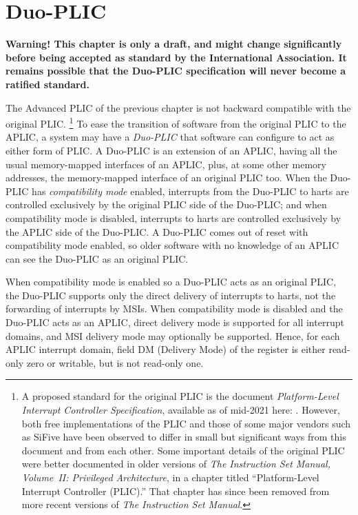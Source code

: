 
\chapter{Duo-PLIC}
\label{ch:DuoPLIC}

\textbf{%
Warning!
This chapter is only a draft, and might change significantly before
being accepted as standard by the {\RISCV} International Association.
It remains possible that the Duo-PLIC specification
will never become a ratified standard.%
}
\bigskip

The Advanced PLIC of the previous chapter is not backward compatible
with the original {\RISCV} PLIC.%
\footnote{%
A proposed standard for the original PLIC is the document
\textit{{\RISCV} Platform-Level Interrupt Controller Specification},
available as of mid-2021 here:
.
However, both free implementations of the PLIC and those of some major
{\RISCV} vendors such as SiFive have been observed to differ in small
but significant ways from this document and from each other.
Some important details of the original PLIC were better documented in
older versions of
\textit{The {\RISCV} Instruction Set Manual, Volume~II: Privileged
Architecture}, in a chapter titled
``Platform-Level Interrupt Controller (PLIC).''
That chapter has since been removed from more recent versions of
\textit{The {\RISCV} Instruction Set Manual}.%
}
To ease the transition of software from the original PLIC to the
APLIC, a {\RISCV} system may have a \emph{\mbox{Duo-PLIC\/}}
that software can configure to act as either form of PLIC.
A \mbox{Duo-PLIC} is an extension of an APLIC, having all the
usual memory-mapped interfaces of an APLIC, plus, at some other
memory addresses, the memory-mapped interface of an original {\RISCV}
PLIC too.
When the \mbox{Duo-PLIC} has \emph{compatibility mode} enabled,
interrupts from the \mbox{Duo-PLIC} to harts are controlled exclusively
by the original PLIC side of the \mbox{Duo-PLIC};
and when compatibility mode is disabled, interrupts to harts
are controlled exclusively by the APLIC side of the
\mbox{Duo-PLIC}.
A \mbox{Duo-PLIC} comes out of reset with compatibility mode enabled,
so older software with no knowledge of an APLIC can see the
\mbox{Duo-PLIC} as an original PLIC.

When compatibility mode is enabled so a \mbox{Duo-PLIC} acts as an
original PLIC, the \mbox{Duo-PLIC} supports only the direct delivery of
interrupts to harts, not the forwarding of interrupts by MSIs.
When compatibility mode is disabled and the \mbox{Duo-PLIC} acts as
an APLIC, direct delivery mode is supported for all interrupt
domains, and MSI delivery mode may optionally be supported.
Hence, for each APLIC interrupt domain, field DM
(Delivery Mode) of the  register is either read-only zero
or writable, but is not read-only one.

